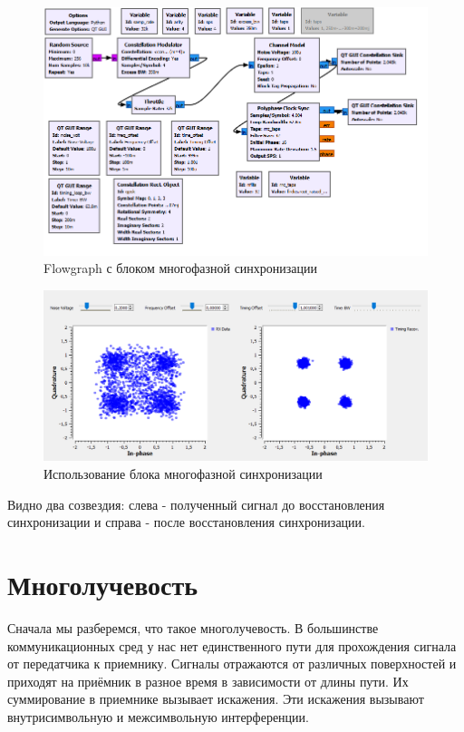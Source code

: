 \documentclass[a4paper, 14pt]{extarticle}
\begin{document}
    \begin{figure}[H]
        \centering
        \includegraphics[width=0.8\linewidth]{flowgraph_multyphase}
        \caption{Flowgraph с блоком многофазной синхронизации}
        \label{fig:flowgraph_multyphase}
    \end{figure}

    \begin{figure}[H]
        \centering
        \includegraphics[width=0.8\linewidth]{multiphase}
        \caption{Использование блока многофазной синхронизации}
        \label{fig:multiphase}
    \end{figure}

    Видно два созвездия: слева - полученный сигнал до восстановления синхронизации и справа - после восстановления синхронизации.

    \newpage


    \section{Многолучевость}
    \label{sec:4}

    Сначала мы разберемся, что такое многолучевость.
    В большинстве коммуникационных сред у нас нет единственного пути для прохождения сигнала от передатчика к приемнику.
    Сигналы отражаются от различных поверхностей и приходят на приёмник в разное время в зависимости от длины пути.
    Их суммирование в приемнике вызывает искажения.
    Эти искажения вызывают внутрисимвольную и межсимвольную интерференции.
\end{document}

